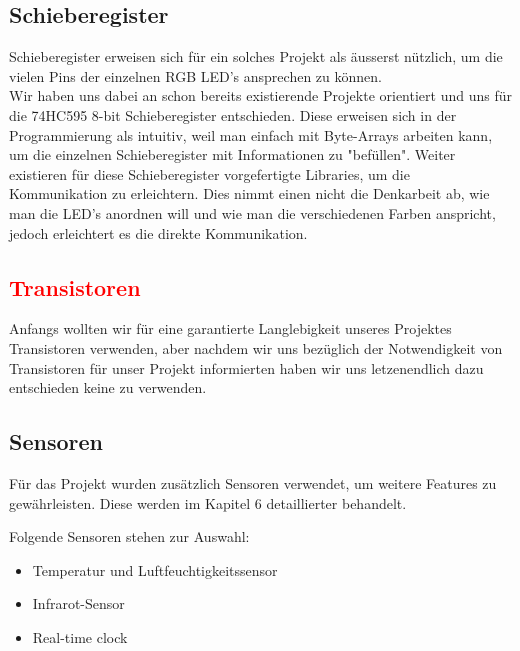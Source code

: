\documentclass[12pt,a4paper]{article}
\begin{document}
\subsection{Schieberegister}

Schieberegister erweisen sich für ein solches Projekt als äusserst nützlich, um die vielen Pins der einzelnen RGB LED's ansprechen zu können. \\

Wir haben uns dabei an schon bereits existierende Projekte orientiert und uns für die 74HC595 8-bit Schieberegister entschieden. Diese erweisen sich in der Programmierung als intuitiv, weil man einfach mit Byte-Arrays arbeiten kann, um die einzelnen Schieberegister mit Informationen zu "befüllen". Weiter existieren für diese Schieberegister vorgefertigte Libraries, um die Kommunikation zu erleichtern.
Dies nimmt einen nicht die Denkarbeit ab, wie man die LED's anordnen will und wie man die verschiedenen Farben anspricht, jedoch erleichtert es die direkte Kommunikation.

\subsection{\textcolor{red}{Transistoren}}

Anfangs wollten wir für eine garantierte Langlebigkeit unseres Projektes Transistoren verwenden, aber nachdem wir uns bezüglich der Notwendigkeit
von Transistoren für unser Projekt informierten haben wir uns letzenendlich dazu entschieden keine zu verwenden.

\subsection{Sensoren}

Für das Projekt wurden zusätzlich Sensoren verwendet, um weitere Features zu gewährleisten. Diese werden im Kapitel 6 detaillierter behandelt.

Folgende Sensoren stehen zur Auswahl:
\begin{itemize}
    \item Temperatur und Luftfeuchtigkeitssensor
    \item Infrarot-Sensor
    \item Real-time clock
\end{itemize}
\end{document}
